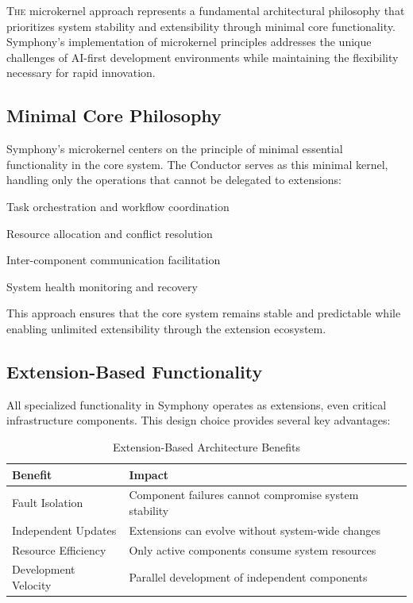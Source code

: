 
\lettrine{T}{he} microkernel approach represents a fundamental architectural philosophy that prioritizes system stability and extensibility through minimal core functionality. Symphony's implementation of microkernel principles addresses the unique challenges of AI-first development environments while maintaining the flexibility necessary for rapid innovation.

\subsection*{Minimal Core Philosophy}

Symphony's microkernel centers on the principle of \textcolor{brandPrimary}{minimal essential functionality} in the core system. The Conductor serves as this minimal kernel, handling only the operations that cannot be delegated to extensions:

\begin{compactlist}
    \item Task orchestration and workflow coordination
    \item Resource allocation and conflict resolution
    \item Inter-component communication facilitation
    \item System health monitoring and recovery
\end{compactlist}

This approach ensures that the core system remains stable and predictable while enabling unlimited extensibility through the extension ecosystem.

\subsection*{Extension-Based Functionality}

All specialized functionality in Symphony operates as extensions, even critical infrastructure components. This design choice provides several key advantages:

\begin{table}[ht]
\centering
\begin{tabular}{@{}ll@{}}
\toprule
\textbf{Benefit} & \textbf{Impact} \\
\midrule
Fault Isolation & Component failures cannot compromise system stability \\
Independent Updates & Extensions can evolve without system-wide changes \\
Resource Efficiency & Only active components consume system resources \\
Development Velocity & Parallel development of independent components \\
\bottomrule
\end{tabular}
\caption{Extension-Based Architecture Benefits}
\end{table}

